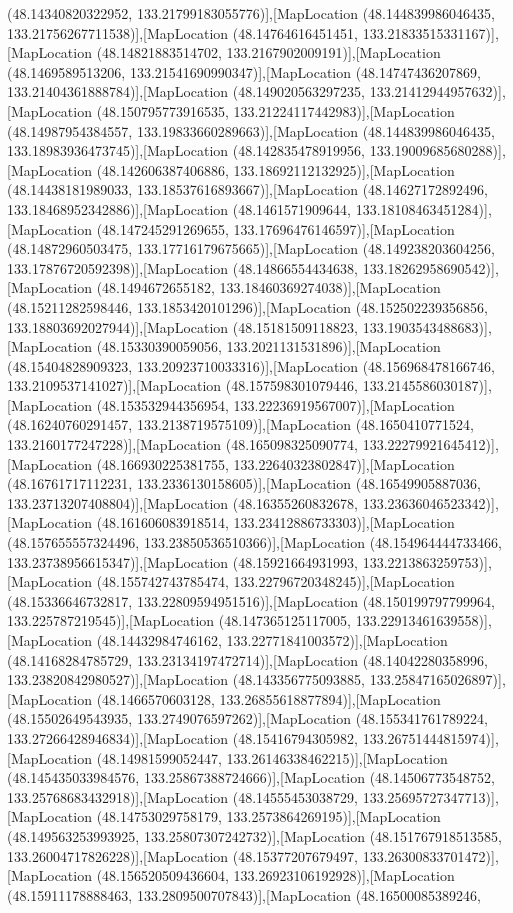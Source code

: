 (48.14340820322952, 133.21799183055776)],[MapLocation (48.144839986046435, 133.21756267711538)],[MapLocation (48.14764616451451, 133.21833515331167)],[MapLocation (48.14821883514702, 133.2167902009191)],[MapLocation (48.1469589513206, 133.21541690990347)],[MapLocation (48.14747436207869, 133.21404361888784)],[MapLocation (48.149020563297235, 133.21412944957632)],[MapLocation (48.150795773916535, 133.21224117442983)],[MapLocation (48.14987954384557, 133.19833660289663)],[MapLocation (48.144839986046435, 133.18983936473745)],[MapLocation (48.142835478919956, 133.19009685680288)],[MapLocation (48.142606387406886, 133.18692112132925)],[MapLocation (48.14438181989033, 133.18537616893667)],[MapLocation (48.14627172892496, 133.18468952342886)],[MapLocation (48.1461571909644, 133.18108463451284)],[MapLocation (48.147245291269655, 133.17696476146597)],[MapLocation (48.14872960503475, 133.17716179675665)],[MapLocation (48.149238203604256, 133.17876720592398)],[MapLocation (48.14866554434638, 133.18262958690542)],[MapLocation (48.1494672655182, 133.18460369274038)],[MapLocation (48.15211282598446, 133.1853420101296)],[MapLocation (48.152502239356856, 133.18803692027944)],[MapLocation (48.15181509118823, 133.1903543488683)],[MapLocation (48.15330390059056, 133.2021131531896)],[MapLocation (48.15404828909323, 133.20923710033316)],[MapLocation (48.156968478166746, 133.2109537141027)],[MapLocation (48.157598301079446, 133.2145586030187)],[MapLocation (48.153532944356954, 133.22236919567007)],[MapLocation (48.16240760291457, 133.2138719575109)],[MapLocation (48.1650410771524, 133.2160177247228)],[MapLocation (48.165098325090774, 133.22279921645412)],[MapLocation (48.166930225381755, 133.22640323802847)],[MapLocation (48.16761717112231, 133.2336130158605)],[MapLocation (48.16549905887036, 133.23713207408804)],[MapLocation (48.16355260832678, 133.23636046523342)],[MapLocation (48.161606083918514, 133.23412886733303)],[MapLocation (48.157655557324496, 133.23850536510366)],[MapLocation (48.154964444733466, 133.23738956615347)],[MapLocation (48.15921664931993, 133.2213863259753)],[MapLocation (48.155742743785474, 133.22796720348245)],[MapLocation (48.15336646732817, 133.22809594951516)],[MapLocation (48.150199797799964, 133.225787219545)],[MapLocation (48.147365125117005, 133.22913461639558)],[MapLocation (48.14432984746162, 133.22771841003572)],[MapLocation (48.14168284785729, 133.23134197472714)],[MapLocation (48.14042280358996, 133.23820842980527)],[MapLocation (48.143356775093885, 133.25847165026897)],[MapLocation (48.1466570603128, 133.26855618877894)],[MapLocation (48.15502649543935, 133.2749076597262)],[MapLocation (48.155341761789224, 133.27266428946834)],[MapLocation (48.15416794305982, 133.26751444815974)],[MapLocation (48.14981599052447, 133.26146338462215)],[MapLocation (48.145435033984576, 133.25867388724666)],[MapLocation (48.14506773548752, 133.25768683432918)],[MapLocation (48.14555453038729, 133.25695727347713)],[MapLocation (48.14753029758179, 133.2573864269195)],[MapLocation (48.149563253993925, 133.25807307242732)],[MapLocation (48.151767918513585, 133.26004717826228)],[MapLocation (48.15377207679497, 133.26300833701472)],[MapLocation (48.156520509436604, 133.26923106192928)],[MapLocation (48.15911178888463, 133.2809500707843)],[MapLocation (48.16500085389246, 